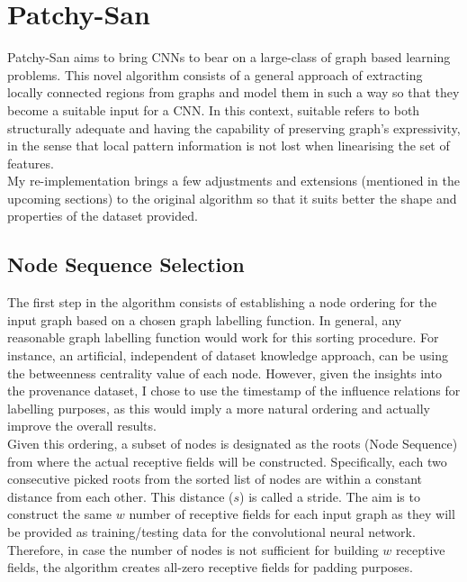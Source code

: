 \section{Patchy-San}

Patchy-San aims to bring CNNs to bear on a large-class of graph based learning problems. This novel algorithm consists of a general approach of extracting locally connected regions from graphs and model them in such a way so that they become a suitable input for a CNN. In this context, suitable refers to both structurally adequate and having the capability of preserving graph's expressivity, in the sense that local pattern information is not lost when linearising the set of features. \\

My re-implementation brings a few adjustments and extensions (mentioned in the upcoming sections) to the original algorithm so that it suits better the shape and properties of the dataset provided. \\

\subsection{Node Sequence Selection}

The first step in the algorithm consists of establishing a node ordering for the input graph based on a chosen graph labelling function. In general, any reasonable graph labelling function would work for this sorting procedure. For instance, an artificial, independent of dataset knowledge approach, can be using the betweenness centrality value of each node. However, given the insights into the provenance dataset, I chose to use the timestamp of the influence relations for labelling purposes, as this would imply a more natural ordering and actually improve the overall results. \\

Given this ordering, a subset of nodes is designated as the roots (Node Sequence) from where the actual receptive fields will be constructed. Specifically, each two consecutive picked roots from the sorted list of nodes are within a constant distance from each other. This distance ($s$) is called a stride. The aim is to construct the same $w$ number of receptive fields for each input graph as they will be provided as training/testing data for the convolutional neural network. Therefore, in case the number of nodes is not sufficient for building $w$ receptive fields, the algorithm creates all-zero receptive fields for padding purposes. \\

